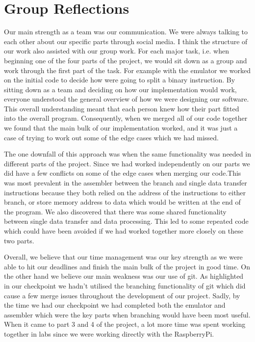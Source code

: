 \documentclass[11pt]{article}
\begin{document}
\section{Group Reflections}
Our main strength as a team was our communication. We were always talking to each other about our specific parts through social media. I think the structure of our work also assisted with our group work. For each major task, i.e. when beginning one of the four parts of the project, we would sit down as a group and work through the first part of the task. For example with the emulator we worked on the initial code to decide how were going to split a binary instruction. By sitting down as a team and deciding on how our implementation would work, everyone understood the general overview of how we were designing our software. This overall understanding meant that each person knew how their part fitted into the overall program. Consequently, when we merged all of our code together we found that the main bulk of our implementation worked, and it was just a case of trying to work out some of the edge cases which we had missed. \par

The one downfall of this approach was when the same functionality was needed in different parts of the project. Since we had worked independently on our parts we did have a few conflicts on some of the edge cases when merging our code.This was most prevalent in the assembler between the branch and single data transfer instructions because they both relied on the address of the instructions to either branch, or store memory address to data which would be written at the end of the program. We also discovered that there was some shared functionality between single data transfer and data processing. This led to some repeated code which could have been avoided if we had worked together more closely on these two parts. \par

Overall, we believe that our time management was our key strength as we were able to hit our deadlines and finish the main bulk of the project in good time. On the other hand we believe our main weakness was our use of git. As highlighted in our checkpoint we hadn’t utilised the branching functionality of git which did cause a few merge issues throughout the development of our project. Sadly, by the time we had our checkpoint we had completed both the emulator and assembler which were the key parts when branching would have been most useful. When it came to part 3 and 4 of the project, a lot more time was spent working together in labs since we were working directly with the RaspberryPi.
\end{document}

